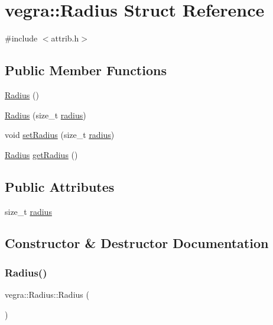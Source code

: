 \hypertarget{structvegra_1_1Radius}{}\section{vegra\+:\+:Radius Struct Reference}
\label{structvegra_1_1Radius}


{\ttfamily \#include $<$attrib.\+h$>$}

\subsection*{Public Member Functions}
\begin{DoxyCompactItemize}
\item 
\mbox{\hyperlink{structvegra_1_1Radius_a0b547e9266dfc2e69851e53869f7569d}{Radius}} ()
\item 
\mbox{\hyperlink{structvegra_1_1Radius_ac74408bbdd81f71abdc00aaed9a5e056}{Radius}} (size\+\_\+t \mbox{\hyperlink{structvegra_1_1Radius_add86636af00229833ff068a123fba5bf}{radius}})
\item 
void \mbox{\hyperlink{structvegra_1_1Radius_adb804ea04783e80a2aa646668018278f}{set\+Radius}} (size\+\_\+t \mbox{\hyperlink{structvegra_1_1Radius_add86636af00229833ff068a123fba5bf}{radius}})
\item 
\mbox{\hyperlink{structvegra_1_1Radius}{Radius}} \mbox{\hyperlink{structvegra_1_1Radius_aabc03c13f35c28db2b9ecafe3d64ae42}{get\+Radius}} ()
\end{DoxyCompactItemize}
\subsection*{Public Attributes}
\begin{DoxyCompactItemize}
\item 
size\+\_\+t \mbox{\hyperlink{structvegra_1_1Radius_add86636af00229833ff068a123fba5bf}{radius}}
\end{DoxyCompactItemize}


\subsection{Constructor \& Destructor Documentation}
\mbox{\label{structvegra_1_1Radius_a0b547e9266dfc2e69851e53869f7569d}} 
\subsubsection{\texorpdfstring{Radius()}{Radius()}\hspace{0.1cm}{\footnotesize\ttfamily [1/2]}}
{\footnotesize\ttfamily vegra\+::\+Radius\+::\+Radius (\begin{DoxyParamCaption}{ }\end{DoxyParamCaption})\hspace{0.3cm}{\ttfamily [inline]}}

